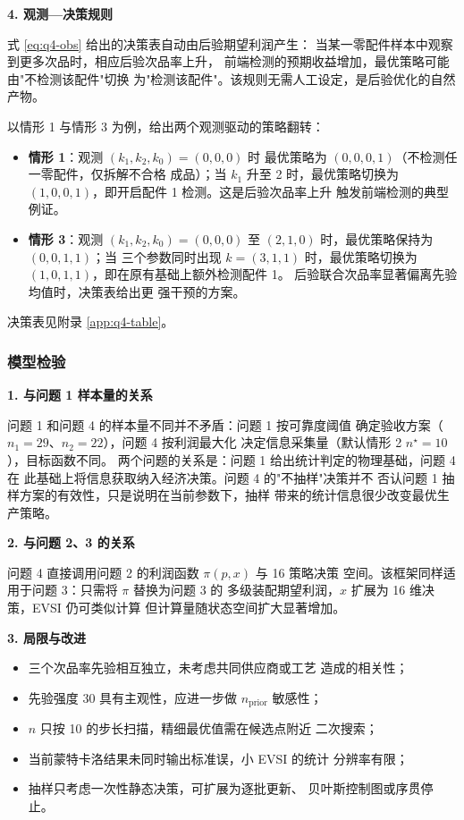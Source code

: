 \documentclass[withoutpreface,bwprint]{cumcmthesis}
\begin{document}
\textbf{4. 观测—决策规则}

式 \ref{eq:q4-obs} 给出的决策表自动由后验期望利润产生：
当某一零配件样本中观察到更多次品时，相应后验次品率上升，
前端检测的预期收益增加，最优策略可能由"不检测该配件"切换
为"检测该配件"。该规则无需人工设定，是后验优化的自然产物。

以情形 1 与情形 3 为例，给出两个观测驱动的策略翻转：

\begin{itemize}
    \item \textbf{情形 1}：观测 $(k_1, k_2, k_0) = (0,0,0)$ 时
    最优策略为 $(0,0,0,1)$（不检测任一零配件，仅拆解不合格
    成品）；当 $k_1$ 升至 2 时，最优策略切换为
    $(1,0,0,1)$，即开启配件 1 检测。这是后验次品率上升
    触发前端检测的典型例证。
    \item \textbf{情形 3}：观测 $(k_1, k_2, k_0) = (0,0,0)$
    至 $(2,1,0)$ 时，最优策略保持为 $(0,0,1,1)$；当
    三个参数同时出现 $k = (3,1,1)$ 时，最优策略切换为
    $(1,0,1,1)$，即在原有基础上额外检测配件 1。
    后验联合次品率显著偏离先验均值时，决策表给出更
    强干预的方案。
\end{itemize}

决策表见附录 \ref{app:q4-table}。

\subsubsection{模型检验}

\textbf{1. 与问题 1 样本量的关系}

问题 1 和问题 4 的样本量不同并不矛盾：问题 1 按可靠度阈值
确定验收方案（$n_1 = 29$、$n_2 = 22$），问题 4 按利润最大化
决定信息采集量（默认情形 2 $n^\star = 10$），目标函数不同。
两个问题的关系是：问题 1 给出统计判定的物理基础，问题 4 在
此基础上将信息获取纳入经济决策。问题 4 的"不抽样"决策并不
否认问题 1 抽样方案的有效性，只是说明在当前参数下，抽样
带来的统计信息很少改变最优生产策略。

\textbf{2. 与问题 2、3 的关系}

问题 4 直接调用问题 2 的利润函数 $\pi(p, x)$ 与 16 策略决策
空间。该框架同样适用于问题 3：只需将 $\pi$ 替换为问题 3 的
多级装配期望利润，$x$ 扩展为 16 维决策，EVSI 仍可类似计算
但计算量随状态空间扩大显著增加。

\textbf{3. 局限与改进}

\begin{itemize}
    \item 三个次品率先验相互独立，未考虑共同供应商或工艺
    造成的相关性；
    \item 先验强度 30 具有主观性，应进一步做 $n_{\mathrm{prior}}$
    敏感性；
    \item $n$ 只按 10 的步长扫描，精细最优值需在候选点附近
    二次搜索；
    \item 当前蒙特卡洛结果未同时输出标准误，小 EVSI 的统计
    分辨率有限；
    \item 抽样只考虑一次性静态决策，可扩展为逐批更新、
    贝叶斯控制图或序贯停止。
\end{itemize}
\end{document}

